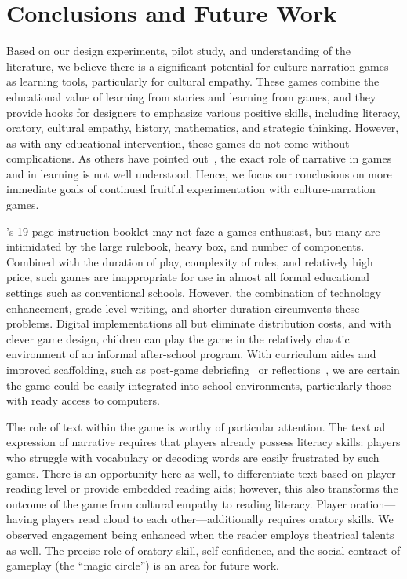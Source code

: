 \documentclass[a4paper]{article}
\begin{document}
\section{Conclusions and Future Work}

Based on our design experiments, pilot study, and understanding of the
literature, we believe there is a significant potential for
culture-narration games as learning tools, particularly for
cultural empathy.
These games combine the educational value of learning from stories
and learning from games, and they provide hooks for designers to 
emphasize various positive skills, including literacy, 
oratory, cultural empathy, history, mathematics, and strategic thinking.
However, as with any educational intervention, these games do not
come without complications.
As others have pointed out~\citep[\textit{e.g.}]{Slota2015}, 
the exact role of narrative in games and in learning is not well
understood. Hence, we focus our conclusions on more immediate
goals of continued fruitful experimentation with culture-narration games.

\totan{}'s 19-page
instruction booklet may not faze a games enthusiast, but 
many are intimidated by the large rulebook, heavy box, and 
number of components.
Combined with the duration
of play, complexity of rules, and relatively high price,
such games are inappropriate for use
in almost all formal educational settings such as conventional
schools.  However, the combination of technology
enhancement, grade-level writing, and shorter duration circumvents
these problems.  Digital implementations all but eliminate
distribution costs, and with clever game design, children can play the
game in the relatively chaotic environment of an informal after-school
program. With curriculum aides and improved scaffolding, such as
post-game debriefing~\citep{Nicholson2012}
or reflections~\citep{Hickey2013},
we are certain the game could be easily
integrated into school environments, particularly those with
ready access to computers.

The role of text within the game is worthy of particular attention.
The textual expression of narrative requires that players already possess
literacy skills: players who struggle with vocabulary or decoding words
are easily frustrated by such games. There is an opportunity
here as well, to differentiate text based on player reading level
or provide embedded reading aids; however, this also transforms
the outcome of the game from cultural empathy to reading literacy.
Player oration---having players read aloud to each
other---additionally requires oratory skills. We observed engagement
being enhanced when the reader employs theatrical talents as well.
The precise role of oratory skill, self-confidence, and the social
contract of gameplay (the ``magic circle'') is an area for future work.
\end{document}
